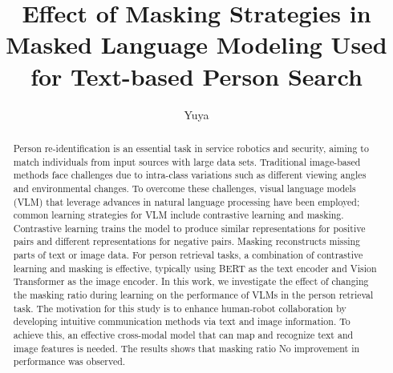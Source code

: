 \documentclass[mscthesis,english,oneside,biblatex,imlex]{template/uefcsthesis}
\title{Effect of Masking Strategies in Masked Language Modeling Used for Text-based Person Search} %
\author{Yuya}{Takagi} %
\date{\thismonth} %
\begin{document}
\maketitle

\begin{abstract}
Person re-identification is an essential task in service robotics and security, aiming to match individuals from input sources with large data sets. Traditional image-based methods face challenges due to intra-class variations such as different viewing angles and environmental changes. To overcome these challenges, visual language models (VLM) that leverage advances in natural language processing have been employed; common learning strategies for VLM include contrastive learning and masking. Contrastive learning trains the model to produce similar representations for positive pairs and different representations for negative pairs. Masking reconstructs missing parts of text or image data.
For person retrieval tasks, a combination of contrastive learning and masking is effective, typically using BERT as the text encoder and Vision Transformer as the image encoder. In this work, we investigate the effect of changing the masking ratio during learning on the performance of VLMs in the person retrieval task. The motivation for this study is to enhance human-robot collaboration by developing intuitive communication methods via text and image information. To achieve this, an effective cross-modal model that can map and recognize text and image features is needed. The results shows that masking ratio No improvement in performance was observed.
\end{abstract}

\frontmatter
\tableofcontents
\mainmatter
\printglossary[type=\acronymtype]


% 


% 



\appendix
% 



\printbibliography[heading=bibintoc]

\backmatter %
\end{document}
